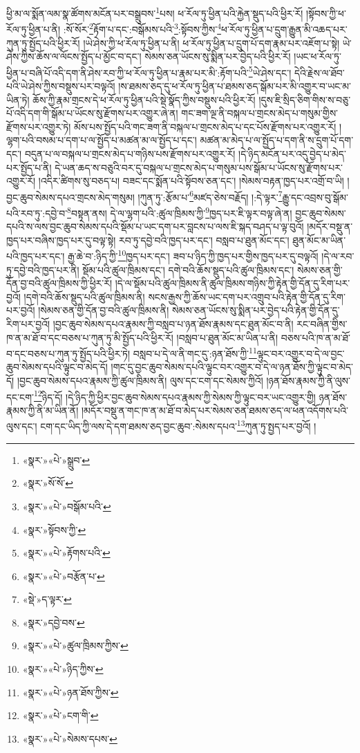ཕྱི་མ་ལ་སྨོན་ལམ་སྣ་ཚོགས་མངོན་པར་བསྒྲུབས་\footnote{«སྣར་»«པེ་»སྒྲུབ་}པས། ཕ་རོལ་ཏུ་ཕྱིན་པའི་རྐྱེན་སྡུད་པའི་ཕྱིར་རོ། །སྟོབས་ཀྱི་ཕ་རོལ་ཏུ་ཕྱིན་པ་ནི། :སོ་སོར་\footnote{«སྣར་»སོ་སོ་}རྟོག་པ་དང་:བསྒོམས་པའི་\footnote{«སྣར་»«པེ་»བསྒོམ་པའི་}:སྟོབས་ཀྱིས་\footnote{«སྣར་»སྟོབས་ཀྱི་}ཕ་རོལ་ཏུ་ཕྱིན་པ་དྲུག་རྒྱུན་མི་འཆད་པར་ཀུན་ཏུ་སྤྱོད་པའི་ཕྱིར་རོ། །ཡེ་ཤེས་ཀྱི་ཕ་རོལ་ཏུ་ཕྱིན་པ་ནི། ཕ་རོལ་ཏུ་ཕྱིན་པ་དྲུག་པོ་དག་རྣམ་པར་འཇོག་པ་སྟེ། ཡེ་ཤེས་ཀྱིས་ཆོས་ལ་ལོངས་སྤྱོད་པ་མྱོང་བ་དང་། སེམས་ཅན་ཡོངས་སུ་སྨིན་པར་བྱེད་པའི་ཕྱིར་རོ། །ཡང་ཕ་རོལ་ཏུ་ཕྱིན་པ་བཞི་པོ་འདི་དག་ནི་ཤེས་རབ་ཀྱི་ཕ་རོལ་ཏུ་ཕྱིན་པ་རྣམ་པར་མི་:རྟོག་པའི་\footnote{«སྣར་»«པེ་»རྟོགས་པའི་}ཡེ་ཤེས་དང་། དེའི་རྗེས་ལ་ཐོབ་པའི་ཡེ་ཤེས་ཀྱིས་བསྡུས་པར་བལྟའོ། །ས་ཐམས་ཅད་དུ་ཕ་རོལ་ཏུ་ཕྱིན་པ་ཐམས་ཅད་སྒོམ་པར་མི་འགྱུར་བ་ཡང་མ་ཡིན་ཏེ། ཆོས་ཀྱི་རྣམ་གྲངས་དེ་ཕ་རོལ་ཏུ་ཕྱིན་པའི་སྡེ་སྣོད་ཀྱིས་བསྡུས་པའི་ཕྱིར་རོ། །དུས་ཇི་སྲིད་ཅིག་གིས་ས་བཅུ་པོ་འདི་དག་གི་སྒོམ་པ་ཡོངས་སུ་རྫོགས་པར་འགྱུར་ཞེ་ན། གང་ཟག་ལྔ་ནི་བསྐལ་པ་གྲངས་མེད་པ་གསུམ་གྱིས་རྫོགས་པར་འགྱུར་ཏེ། མོས་པས་སྤྱོད་པའི་གང་ཟག་ནི་བསྐལ་པ་གྲངས་མེད་པ་དང་པོས་རྫོགས་པར་འགྱུར་རོ། །ལྷག་པའི་བསམ་པ་དག་པ་ལ་སྤྱོད་པ་མཚན་མ་ལ་སྤྱོད་པ་དང་། མཚན་མ་མེད་པ་ལ་སྤྱོད་པ་དག་ནི་ས་དྲུག་པོ་དག་དང་། བདུན་པ་ལ་བསྐལ་པ་གྲངས་མེད་པ་གཉིས་པས་རྫོགས་པར་འགྱུར་རོ། །དེ་ཉིད་མངོན་པར་འདུ་བྱེད་པ་མེད་པར་སྤྱོད་པ་ནི། དེ་ཡན་ཆད་ས་བཅུའི་བར་དུ་བསྐལ་པ་གྲངས་མེད་པ་གསུམ་པས་སྒོམ་པ་ཡོངས་སུ་རྫོགས་པར་འགྱུར་རོ། །འདིར་ཚིགས་སུ་བཅད་པ། བཟང་དང་སྨོན་པའི་སྟོབས་ཅན་དང་། །སེམས་བརྟན་ཁྱད་པར་འགྲོ་བ་ཡི། །བྱང་ཆུབ་སེམས་དཔའ་གྲངས་མེད་གསུམ། །ཀུན་ཏུ་:རྩོམ་པ་\footnote{«སྣར་»«པེ་»བརྩོན་པ་}མཛད་ཅེས་བརྗོད། །:དེ་ལྟར་\footnote{«སྡེ་»ད་ལྟར་}རྒྱུ་དང་འབྲས་བུ་སྒོམ་པའི་རབ་ཏུ་:དབྱེ་བ་\footnote{«སྣར་»དབྱེ་བས་}བསྟན་ནས། དེ་ལ་ལྷག་པའི་:ཚུལ་ཁྲིམས་ཀྱི་\footnote{«སྣར་»«པེ་»ཚུལ་ཁྲིམས་ཀྱིས་}ཁྱད་པར་ཇི་ལྟར་བལྟ་ཞེ་ན། བྱང་ཆུབ་སེམས་དཔའི་ས་ལས་བྱང་ཆུབ་སེམས་དཔའི་སྡོམ་པ་ཡང་དག་པར་བླངས་པ་ལས་ཇི་སྐད་བཤད་པ་ལྟ་བུའོ། །མདོར་བསྡུ་ན་ཁྱད་པར་བཞིས་ཁྱད་པར་དུ་བལྟ་སྟེ། རབ་ཏུ་དབྱེ་བའི་ཁྱད་པར་དང་། བསླབ་པ་ཐུན་མོང་དང་། ཐུན་མོང་མ་ཡིན་པའི་ཁྱད་པར་དང་། རྒྱ་ཆེ་བ་:ཉིད་ཀྱི་\footnote{«སྣར་»«པེ་»ཉིད་ཀྱིས་}ཁྱད་པར་དང་། ཟབ་པ་ཉིད་ཀྱི་ཁྱད་པར་གྱིས་ཁྱད་པར་དུ་བལྟའོ། །དེ་ལ་རབ་ཏུ་དབྱེ་བའི་ཁྱད་པར་ནི། སྡོམ་པའི་ཚུལ་ཁྲིམས་དང་། དགེ་བའི་ཆོས་སྡུད་པའི་ཚུལ་ཁྲིམས་དང་། སེམས་ཅན་གྱི་དོན་བྱ་བའི་ཚུལ་ཁྲིམས་ཀྱི་ཕྱིར་རོ། །དེ་ལ་སྡོམ་པའི་ཚུལ་ཁྲིམས་ནི་ཚུལ་ཁྲིམས་གཉིས་ཀྱི་རྟེན་གྱི་དོན་དུ་རིག་པར་བྱའོ། །དགེ་བའི་ཆོས་སྡུད་པའི་ཚུལ་ཁྲིམས་ནི། སངས་རྒྱས་ཀྱི་ཆོས་ཡང་དག་པར་འགྲུབ་པའི་རྟེན་གྱི་དོན་དུ་རིག་པར་བྱའོ། །སེམས་ཅན་གྱི་དོན་བྱ་བའི་ཚུལ་ཁྲིམས་ནི། སེམས་ཅན་ཡོངས་སུ་སྨིན་པར་བྱེད་པའི་རྟེན་གྱི་དོན་དུ་རིག་པར་བྱའོ། །བྱང་ཆུབ་སེམས་དཔའ་རྣམས་ཀྱི་བསླབ་པ་ཉན་ཐོས་རྣམས་དང་ཐུན་མོང་བ་ནི། རང་བཞིན་གྱིས་ཁ་ན་མ་ཐོ་བ་དང་བཅས་པ་ཀུན་ཏུ་མི་སྤྱོད་པའི་ཕྱིར་རོ། །བསླབ་པ་ཐུན་མོང་མ་ཡིན་པ་ནི། བཅས་པའི་ཁ་ན་མ་ཐོ་བ་དང་བཅས་པ་ཀུན་ཏུ་སྤྱོད་པའི་ཕྱིར་ཏེ། བསླབ་པ་དེ་ལ་ནི་གང་དུ་:ཉན་ཐོས་ཀྱི་\footnote{«སྣར་»«པེ་»ཉན་ཐོས་ཀྱིས་}ལྟུང་བར་འགྱུར་བ་དེ་ལ་བྱང་ཆུབ་སེམས་དཔའི་ལྟུང་བ་མེད་དོ། །གང་དུ་བྱང་ཆུབ་སེམས་དཔའི་ལྟུང་བར་འགྱུར་བ་དེ་ལ་ཉན་ཐོས་ཀྱི་ལྟུང་བ་མེད་དོ། །བྱང་ཆུབ་སེམས་དཔའ་རྣམས་ཀྱི་ཚུལ་ཁྲིམས་ནི། ལུས་དང་ངག་དང་སེམས་ཀྱིའོ། །ཉན་ཐོས་རྣམས་ཀྱི་ནི་ལུས་དང་ངག་\footnote{«སྣར་»«པེ་»ངག་གི་}ཉིད་དོ། །དེ་ཉིད་ཀྱི་ཕྱིར་བྱང་ཆུབ་སེམས་དཔའ་རྣམས་ཀྱི་སེམས་ཀྱི་ལྟུང་བར་ཡང་འགྱུར་གྱི། ཉན་ཐོས་རྣམས་ཀྱི་ནི་མ་ཡིན་ནོ། །མདོར་བསྡུ་ན་གང་ཁ་ན་མ་ཐོ་བ་མེད་པར་སེམས་ཅན་ཐམས་ཅད་ལ་ཕན་འདོགས་པའི་ལུས་དང་། ངག་དང་ཡིད་ཀྱི་ལས་དེ་དག་ཐམས་ཅད་བྱང་ཆུབ་:སེམས་དཔའ་\footnote{«སྣར་»«པེ་»སེམས་དཔས་}ཀུན་ཏུ་སྤྱད་པར་བྱའོ། །
